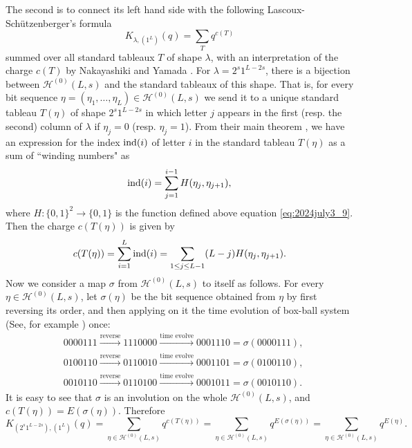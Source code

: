 \documentclass[sn-mathphys-num]{sn-jnl}%
\theoremstyle{thmstyleone}%
\theoremstyle{thmstyletwo}%
\theoremstyle{thmstylethree}%
\begin{document}
\begin{appendices}
The second is to connect its left hand side with the following
Lascoux-Sch\"utzenberger's formula
\begin{equation*}
K_{\lambda, (1^L)}(q) = \sum_{T} q^{c(T)}
\end{equation*}
summed over all standard tableaux $T$ of shape $\lambda$,
with an interpretation of the charge $c(T)$ by Nakayashiki and Yamada \cite{NY97}.
For $\lambda =2^s 1^{L-2s}$, there is a bijection between $\mathcal{H}^{(0)} (L,s)$ and
the standard tableaux of this shape.
That is, for every bit sequence
$\eta =(\eta_1,\dots, \eta_L) \in \mathcal{H}^{(0)} (L,s)$ we send it to a 
unique standard tableau $T(\eta)$ of shape $2^s 1^{L-2s}$ in which
letter $j$ appears in the first (resp. the second) column of $\lambda$ if
$\eta_j =0$ (resp. $\eta_j =1$).
From their main theorem \cite[Theorem 4.2]{NY97}, we have an expression for the index ${\rm ind}(i)$
of letter $i$ in the 
standard tableau $T(\eta)$ as a sum of  ``winding numbers"  \cite[Example 2.15]{NY97} as
\begin{equation*}
{\rm ind}(i) = \sum_{j=1}^{i-1} H(\eta_j,\eta_{j+1}),
\end{equation*}
where $H: \{0,1\}^2 \rightarrow \{0,1\}$ is the function defined
above equation \eqref{eq:2024july3_9}. 
Then the charge $c(T(\eta))$ is given by
\begin{equation*}
c(T(\eta)) = \sum_{i=1}^L {\rm ind}(i)  = \sum_{1 \leq j \leq L-1} (L-j) H(\eta_j,\eta_{j+1}).
\end{equation*}
Now we consider a map $\sigma$ from $\mathcal{H}^{(0)} (L,s)$ to itself as follows.
For every $\eta \in \mathcal{H}^{(0)} (L,s)$, let $\sigma (\eta)$ be the bit sequence
obtained from $\eta$ by first reversing its order, and then applying on it the time evolution
of box-ball system (See, for example \cite{CKST2023, Takagi1}) once:
\begin{align*}
&0000111 \xrightarrow{\text{reverse}} 1110000 \xrightarrow{\text{time evolve}} 0001110=\sigma(0000111) ,\\
&0100110 \xrightarrow{\text{reverse}} 0110010 \xrightarrow{\text{time evolve}} 0001101=\sigma(0100110),\\
&0010110 \xrightarrow{\text{reverse}} 0110100 \xrightarrow{\text{time evolve}} 0001011=\sigma(0010110).
\end{align*}
It is easy to see that $\sigma$ is an involution on the whole $\mathcal{H}^{(0)} (L,s)$, and 
$c(T(\eta)) = E(\sigma (\eta))$.
Therefore
\begin{equation*}
K_{(2^s 1^{L-2s}), (1^L)}(q) = \sum_{\eta \in \mathcal{H}^{(0)} (L,s)} q^{c(T(\eta))} 
=\sum_{\eta \in \mathcal{H}^{(0)} (L,s)} q^{E(\sigma (\eta))} 
=\sum_{\eta \in \mathcal{H}^{(0)} (L,s)} q^{E(\eta)}. 
\end{equation*}


\end{appendices}
\end{document}
